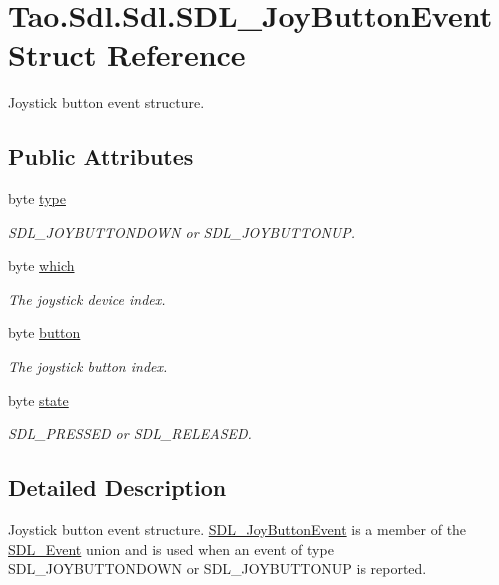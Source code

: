 \hypertarget{struct_tao_1_1_sdl_1_1_sdl_1_1_s_d_l___joy_button_event}{
\section{Tao.Sdl.Sdl.SDL\_\-JoyButtonEvent Struct Reference}
\label{struct_tao_1_1_sdl_1_1_sdl_1_1_s_d_l___joy_button_event}
}


Joystick button event structure.  


\subsection*{Public Attributes}
\begin{DoxyCompactItemize}
\item 
byte \hyperlink{struct_tao_1_1_sdl_1_1_sdl_1_1_s_d_l___joy_button_event_a97d8df7caeed13e83b3ad8903f95d9cb}{type}
\begin{DoxyCompactList}\small\item\em SDL\_\-JOYBUTTONDOWN or SDL\_\-JOYBUTTONUP. \item\end{DoxyCompactList}\item 
byte \hyperlink{struct_tao_1_1_sdl_1_1_sdl_1_1_s_d_l___joy_button_event_a028d7743bcc19aa275f0557d3887858a}{which}
\begin{DoxyCompactList}\small\item\em The joystick device index. \item\end{DoxyCompactList}\item 
byte \hyperlink{struct_tao_1_1_sdl_1_1_sdl_1_1_s_d_l___joy_button_event_a94d2880b48947c6bac2b1559c410160d}{button}
\begin{DoxyCompactList}\small\item\em The joystick button index. \item\end{DoxyCompactList}\item 
byte \hyperlink{struct_tao_1_1_sdl_1_1_sdl_1_1_s_d_l___joy_button_event_a619b7e193745b69d03fa61e6968376a9}{state}
\begin{DoxyCompactList}\small\item\em SDL\_\-PRESSED or SDL\_\-RELEASED. \item\end{DoxyCompactList}\end{DoxyCompactItemize}


\subsection{Detailed Description}
Joystick button event structure. \hyperlink{struct_tao_1_1_sdl_1_1_sdl_1_1_s_d_l___joy_button_event}{SDL\_\-JoyButtonEvent} is a member of the \hyperlink{struct_tao_1_1_sdl_1_1_s_d_l___event}{SDL\_\-Event} union and is used when an event of type SDL\_\-JOYBUTTONDOWN or SDL\_\-JOYBUTTONUP is reported. 

